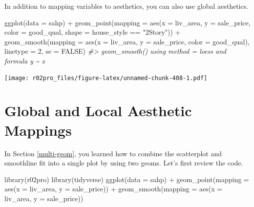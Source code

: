 \documentclass[
]{book}
\newenvironment{Shaded}{\begin{snugshade}}{\end{snugshade}}
\newcommand{\AttributeTok}[1]{\textcolor[rgb]{0.77,0.63,0.00}{#1}}
\newcommand{\CommentTok}[1]{\textcolor[rgb]{0.56,0.35,0.01}{\textit{#1}}}
\newcommand{\ConstantTok}[1]{\textcolor[rgb]{0.00,0.00,0.00}{#1}}
\newcommand{\DecValTok}[1]{\textcolor[rgb]{0.00,0.00,0.81}{#1}}
\newcommand{\FunctionTok}[1]{\textcolor[rgb]{0.00,0.00,0.00}{#1}}
\newcommand{\NormalTok}[1]{#1}
\newcommand{\SpecialCharTok}[1]{\textcolor[rgb]{0.00,0.00,0.00}{#1}}
\newcommand{\StringTok}[1]{\textcolor[rgb]{0.31,0.60,0.02}{#1}}
\begin{document}
In addition to mapping variables to aesthetics, you can also use global aesthetics.

\begin{Shaded}
\begin{Highlighting}[]
\FunctionTok{ggplot}\NormalTok{(}\AttributeTok{data =}\NormalTok{ sahp) }\SpecialCharTok{+} \FunctionTok{geom\_point}\NormalTok{(}\AttributeTok{mapping =} \FunctionTok{aes}\NormalTok{(}\AttributeTok{x =}\NormalTok{ liv\_area, }\AttributeTok{y =}\NormalTok{ sale\_price, }\AttributeTok{color =}\NormalTok{ good\_qual, }\AttributeTok{shape =}\NormalTok{ house\_style }\SpecialCharTok{==} \StringTok{"2Story"}\NormalTok{)) }\SpecialCharTok{+} \FunctionTok{geom\_smooth}\NormalTok{(}\AttributeTok{mapping =} \FunctionTok{aes}\NormalTok{(}\AttributeTok{x =}\NormalTok{ liv\_area, }\AttributeTok{y =}\NormalTok{ sale\_price, }\AttributeTok{color =}\NormalTok{ good\_qual), }\AttributeTok{linetype =} \DecValTok{2}\NormalTok{, }\AttributeTok{se =} \ConstantTok{FALSE}\NormalTok{)}
\CommentTok{\#\textgreater{} \textasciigrave{}geom\_smooth()\textasciigrave{} using method = \textquotesingle{}loess\textquotesingle{} and formula \textquotesingle{}y \textasciitilde{} x\textquotesingle{}}
\end{Highlighting}
\end{Shaded}

\texttt{[image: r02pro\_files/figure-latex/unnamed-chunk-408-1.pdf]}

\hypertarget{global-local-mapping}{%
\section{Global and Local Aesthetic Mappings}\label{global-local-mapping}}

In Section \ref{multi-geom}, you learned how to combine the scatterplot and smoothline fit into a single plot by using two geoms. Let's first review the code.

\begin{Shaded}
\begin{Highlighting}[]
\FunctionTok{library}\NormalTok{(r02pro)}
\FunctionTok{library}\NormalTok{(tidyverse)}
\FunctionTok{ggplot}\NormalTok{(}\AttributeTok{data =}\NormalTok{ sahp) }\SpecialCharTok{+} \FunctionTok{geom\_point}\NormalTok{(}\AttributeTok{mapping =} \FunctionTok{aes}\NormalTok{(}\AttributeTok{x =}\NormalTok{ liv\_area, }\AttributeTok{y =}\NormalTok{ sale\_price)) }\SpecialCharTok{+} \FunctionTok{geom\_smooth}\NormalTok{(}\AttributeTok{mapping =} \FunctionTok{aes}\NormalTok{(}\AttributeTok{x =}\NormalTok{ liv\_area, }\AttributeTok{y =}\NormalTok{ sale\_price))}
\end{Highlighting}
\end{Shaded}
\end{document}
